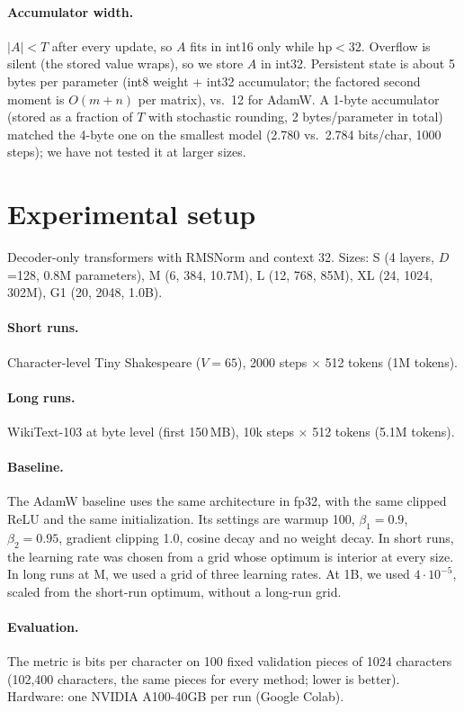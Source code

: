 \documentclass[11pt]{article}
\begin{document}
\paragraph{Accumulator width.} $|A| < T$ after every update, so $A$ fits in int16 only while $\mathrm{hp}<32$. Overflow is silent (the stored value wraps), so we store $A$ in int32. Persistent state is about 5 bytes per parameter (int8 weight + int32 accumulator; the factored second moment is $O(m+n)$ per matrix), vs.\ 12 for AdamW. A 1-byte accumulator (stored as a fraction of $T$ with stochastic rounding, 2 bytes/parameter in total) matched the 4-byte one on the smallest model (2.780 vs.\ 2.784 bits/char, 1000 steps); we have not tested it at larger sizes.

\section{Experimental setup}
Decoder-only transformers with RMSNorm and context 32. Sizes: S (4 layers, $D$=128, 0.8M parameters), M (6, 384, 10.7M), L (12, 768, 85M), XL (24, 1024, 302M), G1 (20, 2048, 1.0B).

\paragraph{Short runs.} Character-level Tiny Shakespeare ($V=65$), 2000 steps $\times$ 512 tokens (1M tokens).

\paragraph{Long runs.} WikiText-103 at byte level (first 150\,MB), 10k steps $\times$ 512 tokens (5.1M tokens).

\paragraph{Baseline.} The AdamW baseline uses the same architecture in fp32, with the same clipped ReLU and the same initialization. Its settings are warmup 100, $\beta_1=0.9$, $\beta_2=0.95$, gradient clipping 1.0, cosine decay and no weight decay. In short runs, the learning rate was chosen from a grid whose optimum is interior at every size. In long runs at M, we used a grid of three learning rates. At 1B, we used $4\cdot10^{-5}$, scaled from the short-run optimum, without a long-run grid.

\paragraph{Evaluation.} The metric is bits per character on 100 fixed validation pieces of 1024 characters (102{,}400 characters, the same pieces for every method; lower is better). Hardware: one NVIDIA A100-40GB per run (Google Colab).
\end{document}
